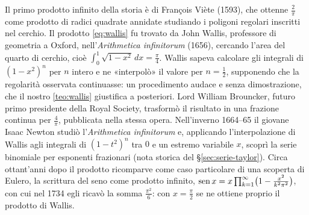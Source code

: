 \begin{notastorica}
Il primo prodotto infinito della storia è di François Viète (1593), che ottenne $\frac2\pi$
come prodotto di radici quadrate annidate studiando i poligoni regolari inscritti nel
cerchio. Il prodotto \eqref{eq:wallis} fu trovato da John Wallis, professore di geometria a
Oxford, nell'\emph{Arithmetica infinitorum} (1656), cercando l'area del quarto di cerchio,
cioè $\int_{0}^{1}\sqrt{1-x^{2}}\,dx=\frac\pi4$. Wallis sapeva calcolare gli integrali di $(1-x^{2})^{n}$ per
$n$ intero e ne «interpolò» il valore per $n=\frac12$, supponendo che la regolarità osservata
continuasse: un procedimento audace e senza dimostrazione, che il nostro
\cref{teo:wallis} giustifica a posteriori. Lord William Brouncker, futuro primo
presidente della Royal Society, trasformò il risultato in una frazione continua per
$\frac4\pi$, pubblicata nella stessa opera. Nell'inverno 1664--65 il giovane Isaac Newton
studiò l'\emph{Arithmetica infinitorum} e, applicando l'interpolazione di Wallis agli
integrali di $(1-t^{2})^{n}$ tra $0$ e un estremo variabile $x$, scoprì la serie binomiale
per esponenti frazionari (nota storica del \S\ref{sec:serie-taylor}). Circa ottant'anni
dopo il prodotto ricomparve come caso particolare di una scoperta di Eulero, la
scrittura del seno come prodotto infinito,
$\operatorname{sen} x=x\prod_{k=1}^{\infty}\bigl(1-\frac{x^{2}}{k^{2}\pi^{2}}\bigr)$, con cui nel 1734 egli ricavò la somma
$\frac{\pi^{2}}6$: con $x=\frac\pi2$ se ne ottiene proprio il prodotto di Wallis.
\end{notastorica}
